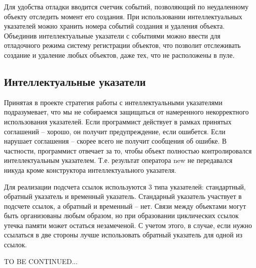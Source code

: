 \documentclass{article}
\newcommand{\plaincode}[1]{\noindent\textsf{#1}}
\begin{document}
Для удобства отладки вводится счетчик событий, позволяющий по неудаленному объекту отследить момент его создания. При использовании интеллектуальных указателей можно хранить номера событий создания и удаления объекта. Объединив интеллектуальные указатели с событиями можно ввести для отладочного режима систему регистрации объектов, что позволит отслеживать создание и удаление любых объектов, даже тех, что не расположены в пуле.

\subsection{Интеллектуальные указатели}
Принятая в проекте стратегия работы с интеллектуальными указателями подразумевает, что мы не собираемся защищаться от намеренного некорректного использования указателей. Если программист действует в рамках принятых соглашений -- хорошо, он получит предупреждение, если ошибется. Если нарушает соглашения -- скорее всего не получит сообщения об ошибке. В частности, программист отвечает за то, чтобы объект полностью контролировался интеллектуальным указателем. Т.е. результат оператора \plaincode{new} не передавался никуда кроме конструктора интеллектуального указателя.

Для реализации подсчета ссылок используются 3 типа указателей: стандартный, обратный указатель и временный указатель. Стандарный указатель участвует в подсчете ссылок, а обратный и временный -- нет. Связи между объектами могут быть организованы любым образом, но при образовании циклических ссылок утечка памяти может остаться незамеченой. С учетом этого, в случае, если нужно ссылаться в две стороны лучше использовать обратный указатель для одной из ссылок.

\centerline\plaincode{TO BE CONTINUED...}
\end{document}
